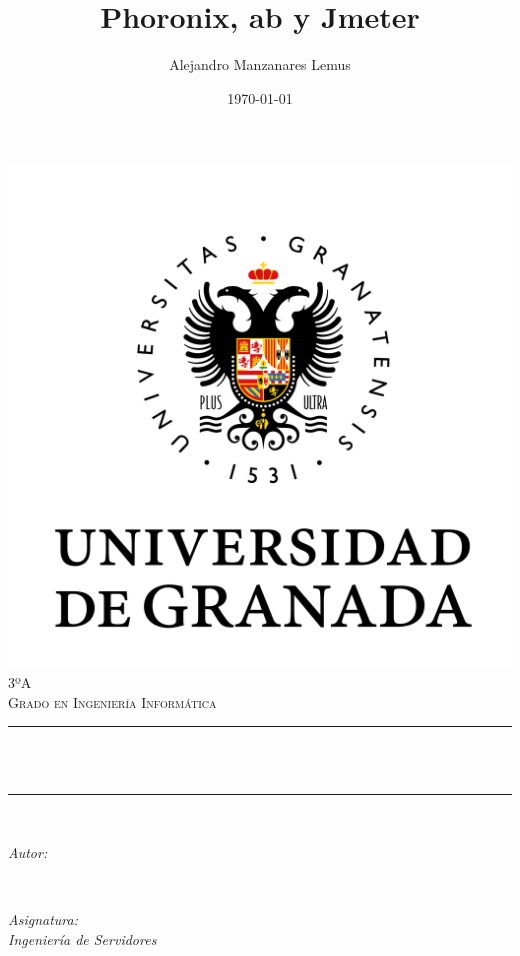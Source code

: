 \documentclass[12pt, spanish]{article}
\title{Phoronix, ab y Jmeter}
\author{Alejandro Manzanares Lemus }
\date{\today}
\makeatletter
\let\thetitle\@title
\let\theauthor\@author
\let\thedate\@date
\makeatother
\begin{document}
\begin{titlepage}
    \centering
    \vspace*{0.5 cm}
    \includegraphics[scale = 0.5]{UGR.png}\\[1.0 cm]
    \textsc{\large 3ºA}\\[0.5 cm]            
    \textsc{\large Grado en Ingeniería Informática}\\[0.5 cm]              
    \rule{\linewidth}{0.2 mm} \\[0.4 cm]
    { \huge \bfseries \thetitle}\\
    \rule{\linewidth}{0.2 mm} \\[1.5 cm]
    
    \begin{minipage}{0.4\textwidth}
        \begin{flushleft} \large
            \emph{Autor:}\\
            \theauthor
            \end{flushleft}
            \end{minipage}~
            \begin{minipage}{0.4\textwidth}
            \begin{flushright} \large
            \emph{Asignatura: \\
            Ingeniería de Servidores}                   
        \end{flushright}
    \end{minipage}\\[1 cm]
  	
    {\large \thedate}\\[1 cm]
 	
    \vfill
    
\end{titlepage}
\end{document}
